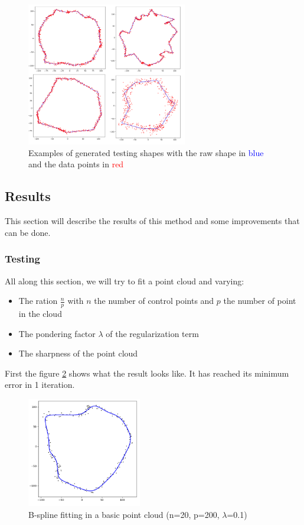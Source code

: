 \documentclass{article}
\begin{document}
\begin{figure}[H]
    \centering
    \includegraphics[width=7cm]{images/shape_gen_examples.png}
    \caption[Examples of generated testing shapes]{Examples of generated testing shapes with the raw shape in \textcolor{blue}{blue} and the data points in \textcolor{red}{red}}
    \label{fig:shape_gen_examples}
\end{figure}


\subsection{Results}

This section will describe the results of this method and some improvements that can be done.

\subsubsection{Testing}

All along this section, we will try to fit a point cloud and varying:

\begin{itemize}
    \item The ration $\frac{n}{p}$ with $n$ the number of control points and $p$ the number of point in the cloud
    \item The pondering factor $\lambda$ of the regularization term
    \item The sharpness of the point cloud
\end{itemize}

First the figure \ref{fig:bsp_res_general} shows what the result looks like. It has reached its minimum error in 1 iteration. 

\begin{figure}[H]
    \centering
    \includegraphics[width=5cm]{images/bsp_res_general.png}
    \caption[B-spline fitting in a basic point cloud]{B-spline fitting in a basic point cloud (n=20, p=200, $\lambda$=0.1)}
    \label{fig:bsp_res_general}
\end{figure}
\end{document}
